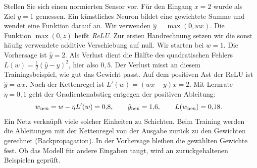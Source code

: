 Stellen Sie sich einen normierten Sensor vor. Für den Eingang \(x=2\) wurde als Ziel \(y=1\) gemessen. Ein künstliches Neuron bildet eine gewichtete Summe und wendet eine Funktion darauf an. Wir verwenden \(\hat y=\max(0,wx)\). Die Funktion \(\max(0,z)\) heißt \emph{ReLU}. Zur ersten Handrechnung setzen wir die sonst häufig verwendete additive Verschiebung auf null.
Wir starten bei \(w=1\). Die Vorhersage ist \(\hat y=2\). Als Verlust dient die Hälfte des quadratischen Fehlers \(L(w)=\tfrac12(\hat y-y)^2\), hier also \(0{,}5\). Der Verlust misst an diesem Trainingsbeispiel, wie gut das Gewicht passt.
Auf dem positiven Ast der ReLU ist \(\hat y=wx\). Nach der Kettenregel ist \(L'(w)=(wx-y)x=2\). Mit Lernrate \(\eta=0{,}1\) geht der Gradientenabstieg entgegen der positiven Ableitung:
\[
 w_{\rm neu}=w-\eta L'(w)=0{,}8,\qquad
 \hat y_{\rm neu}=1{,}6,\qquad L(w_{\rm neu})=0{,}18 .
\]
Ein Netz verknüpft viele solcher Einheiten zu Schichten. Beim Training werden die Ableitungen mit der Kettenregel von der Ausgabe zurück zu den Gewichten gerechnet (Backpropagation). In der Vorhersage bleiben die gewählten Gewichte fest. Ob das Modell für andere Eingaben taugt, wird an zurückgehaltenen Beispielen geprüft.

